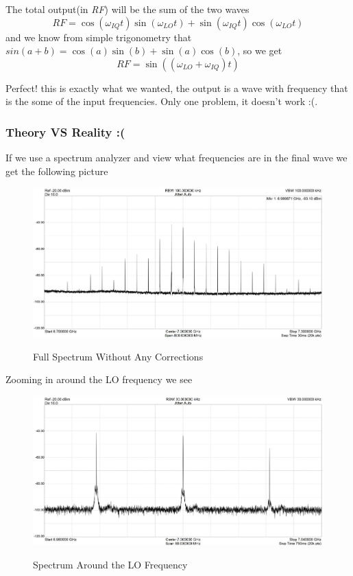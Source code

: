 \documentclass[english, a4paper, 12pt, twoside]{article}
\numberwithin{equation}{section} %
\begin{document}
The total output(in \textit{RF}) will be the sum of the two waves
$$RF = \cos(\omega_{IQ}t)\sin(\omega_{LO}t) + \sin(\omega_{IQ}t)\cos(\omega_{LO}t)$$
and we know from simple trigonometry that $sin(a + b) = \cos(a)\sin(b) + \sin(a)\cos(b)$, so we get
\begin{equation}
    \boxed{RF = \sin((\omega_{LO} + \omega_{IQ})t)}
\end{equation}

Perfect! this is exactly what we wanted, the output is a wave with frequency that is the some of the input frequencies. Only one problem, it doesn't work :(.

\subsubsection{Theory VS Reality :(} %
If we use a spectrum analyzer and view what frequencies are in the final wave we get the following picture

\begin{figure}[H]
    \centering
    \caption{Full Spectrum Without Any Corrections}
    \includegraphics[width=0.8\columnwidth]{full-spectrum-no-correction.jpg} %
    \label{fig:Full-spectrum-no-corrections}
\end{figure}
Zooming in around the LO frequency we see
\begin{figure}[H]
    \centering
    \caption{Spectrum Around the LO Frequency}
    \includegraphics[width=0.8\columnwidth]{Important-Spectrum-no-correction.jpg} %
    \label{fig:closeup-spectrum-no-corrections}
\end{figure}
\end{document}
